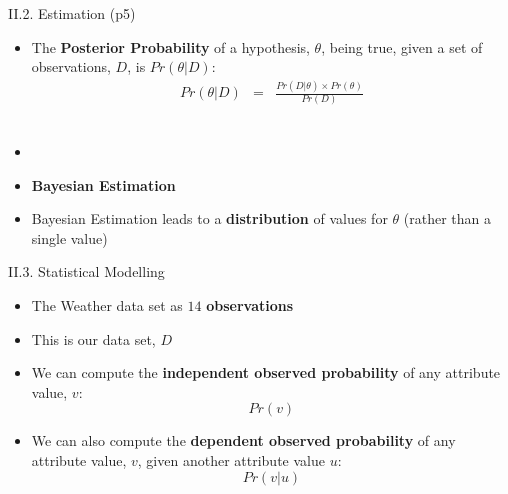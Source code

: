 \documentclass[handout]{beamer}
\newcommand{\strong}[1]{\textbf{\color{teal} #1}}
\newcommand{\stronger}[1]{\textbf{\color{purple} #1}}
\begin{document}
\begin{frame}{II.2. Estimation (p5)}
\begin{itemize}
\item The \stronger{Posterior Probability} of a hypothesis, $\theta$, being true, given a set of observations, $D$, is $Pr(\theta | D)$:
\begin{eqnarray*}
Pr( \theta | D ) & = & \frac{ Pr( D | \theta ) \times Pr(\theta) }{ Pr(D) }
\end{eqnarray*}
\
\item[]
\item[] \stronger{Bayesian Estimation}
\item Bayesian Estimation leads to a \strong{distribution} of values for $\theta$ (rather than a single value)
\end{itemize}
\end{frame}
\begin{frame}{II.3. Statistical Modelling}
\begin{itemize}
\item The Weather data set as $14$ \strong{observations}
\item This is our data set, $D$
\item We can compute the \strong{independent observed probability} of any attribute value, $v$:
\[
	Pr(v)
\]
\item We can also compute the \strong{dependent observed probability} of any attribute value, $v$, given another attribute value $u$:
\[
	Pr(v|u)
\]
\end{itemize}
\end{frame}
\end{document}
